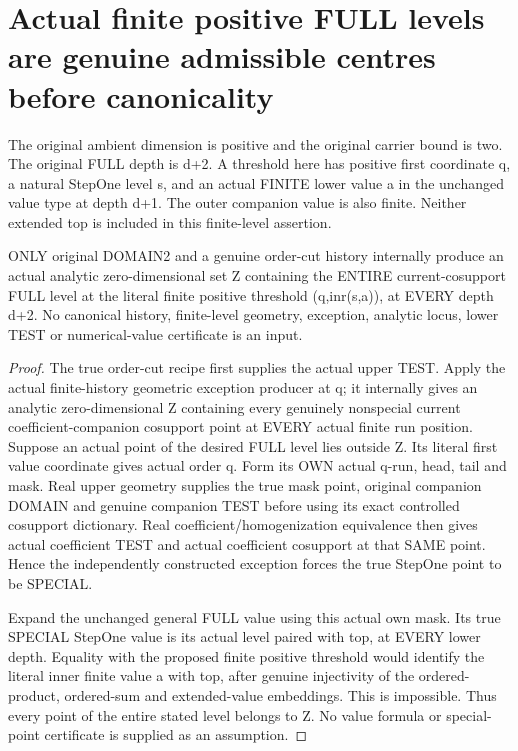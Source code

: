 \section{Actual finite positive FULL levels are genuine admissible centres before canonicality}

The original ambient dimension is positive and the original carrier bound is
two. The original FULL depth is d+2. A threshold here has positive first
coordinate q, a natural StepOne level s, and an actual FINITE lower value a
in the unchanged value type at depth d+1. The outer companion value is also
finite. Neither extended top is included in this finite-level assertion.

\begin{theorem}
\label{hir:original-order-cut-finite-positive-full-level-exception}
\leanok
ONLY original DOMAIN2 and a genuine order-cut history internally produce an
actual analytic zero-dimensional set Z containing the ENTIRE current-cosupport
FULL level at the literal finite positive threshold (q,inr(s,a)), at EVERY
depth d+2. No canonical history, finite-level geometry, exception, analytic
locus, lower TEST or numerical-value certificate is an input.
\end{theorem}
\begin{proof}
The true order-cut recipe first supplies the actual upper TEST. Apply the
actual finite-history geometric exception producer at q; it internally gives
an analytic zero-dimensional Z containing every genuinely nonspecial current
coefficient-companion cosupport point at EVERY actual finite run position.
Suppose an actual point of the desired FULL level lies outside Z. Its literal
first value coordinate gives actual order q. Form its OWN actual q-run,
head, tail and mask. Real upper geometry supplies the true mask point, original
companion DOMAIN and genuine companion TEST before using its exact controlled
cosupport dictionary. Real coefficient/homogenization equivalence then gives
actual coefficient TEST and actual coefficient cosupport at that SAME point.
Hence the independently constructed exception forces the true StepOne point
to be SPECIAL.

Expand the unchanged general FULL value using this actual own mask. Its true
SPECIAL StepOne value is its actual level paired with top, at EVERY lower
depth. Equality with the proposed finite positive threshold would identify
the literal inner finite value a with top, after genuine injectivity of the
ordered-product, ordered-sum and extended-value embeddings. This is
impossible. Thus every point of the entire stated level belongs to Z.
No value formula or special-point certificate is supplied as an assumption.
\end{proof}


